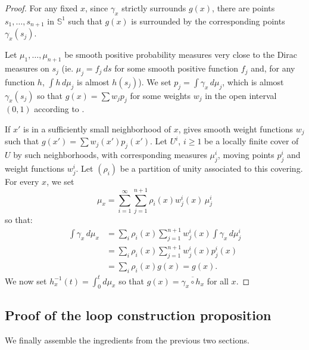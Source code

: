 \begin{proof}
  For any fixed $x$, since $γ_x$ strictly surrounds $g(x)$, there are points
  $s_1, …, s_{n+1}$ in $𝕊^1$ such that $g(x)$ is surrounded
  by the corresponding points $γ_x(s_j)$.

  Let $μ_1, …, μ_{n+1}$ be smooth positive probability measures very
  close to the Dirac measures on $s_j$ (ie. $μ_j = f_j\, ds$ for some
  smooth positive function $f_j$ and, for any function $h$,
  $\int h\,dμ_j$ is almost $h(s_j)$).  We set $p_j = \int γ_x\, d\mu_j$, which
  is almost $γ_x(s_j)$ so that $g(x) = \sum w_j p_j$ for some weights
  $w_j$ in the open interval $(0, 1)$ according to
  .

  If $x'$ is in a sufficiently small neighborhood of $x$,
   gives smooth weight functions $w_j$
  such that $g(x') = \sum w_j(x')p_j(x')$.
  Let $U^i$, $i ≥ 1$ be a locally finite cover of $U$ by such
  neighborhoods, with corresponding measures $μ_j^i$, moving points
  $p_j^i$ and weight functions $w_j^i$.
  Let $(ρ_i)$ be a partition of unity associated to this covering. For
  every $x$, we set
  \[
    μ_x = \sum_{i=1}^∞ \sum_{j=1}^{n+1} ρ_i(x)w_j^i(x)\, μ_j^i
  \]
  so that:
  \begin{align*}
    \int γ_x\, dμ_x &=
    \sum_i ρ_i(x)\sum_{j=1}^{n+1} w_j^i(x) \int γ_x\, dμ_j^i\\
    &= \sum_i ρ_i(x)\sum_{j=1}^{n+1} w_j^i(x) p_j^i(x)\\
    &= \sum_i ρ_i(x) g(x) = g(x).
  \end{align*}
  We now set $h_x^{-1}(t) = \int_0^tdμ_x$ so that
  $g(x) = \overline{γ_x ∘ h_x}$ for all $x$.
\end{proof}

\subsection{Proof of the loop construction proposition}
\label{sub:proof_of_the_loop_construction_proposition}

We finally assemble the ingredients from the previous two sections.

